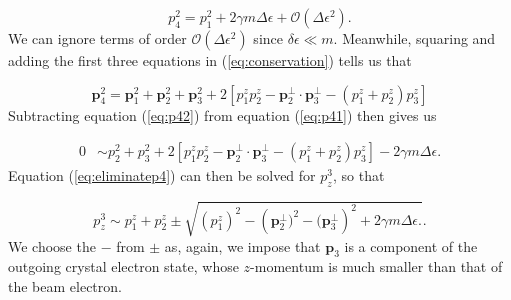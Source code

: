 \documentclass{article}
\begin{document}
\begin{equation}
\label{eq:p41}
    p^2_4
    =
    p^2_1 + 2\gamma m\Delta\epsilon + \mathcal{O}(\Delta\epsilon^2).
\end{equation}
%
We can ignore terms of order $\mathcal{O}(\Delta\epsilon^2)$ since $\delta\epsilon\ll m$. 
Meanwhile, squaring and adding the first three equations in (\ref{eq:conservation}) tells us that

\begin{equation}
\label{eq:p42}
   \mathbf{p}_4^2
   =
   \mathbf{p}_1^2 + \mathbf{p}_2^2 + \mathbf{p}_3^2
   + 2\left[
   p^z_1p^z_2 - \mathbf{p}^{\perp}_2 \cdot \mathbf{p}^{\perp}_3 - (p^z_1 + p^z_2)p^z_3
   \right]
\end{equation}
%
Subtracting equation (\ref{eq:p42}) from equation (\ref{eq:p41}) then gives us

\begin{equation}
\label{eq:eliminatep4}
\begin{aligned}
    0
    &\sim
    p^2_2 + p^2_3
    +
    2\left[
    p^z_1p^z_2 - \mathbf{p}^{\perp}_2 \cdot \mathbf{p}^{\perp}_3 - (p^z_1 + p^z_2)p^z_3
    \right]
    -
    2\gamma m\Delta\epsilon.
\end{aligned}
\end{equation}
%
Equation (\ref{eq:eliminatep4}) can then be solved for $p^3_z$, so that

\begin{equation}
\label{eq:p3z}
    p^3_z
    \sim
    p_1^z + p_2^z
    \pm
    \sqrt{
    \left(p_1^z\right)^2
    -
    \left(\mathbf{p}_2^\perp)^2 - (\mathbf{p}_3^\perp\right)^2
    +
    2\gamma m\Delta\epsilon.
    }.
\end{equation}
%
We choose the $-$ from $\pm$ as, again, we impose that $\mathbf{p}_3$ is a component of the outgoing crystal electron state, whose $z$-momentum is much smaller than that of the beam electron.
\end{document}
